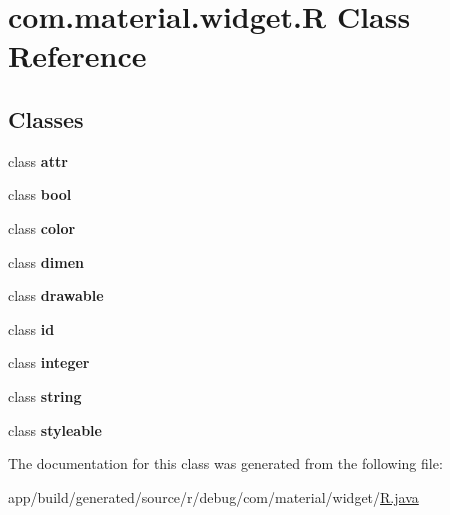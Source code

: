 \hypertarget{classcom_1_1material_1_1widget_1_1_r}{}\section{com.\+material.\+widget.\+R Class Reference}
\label{classcom_1_1material_1_1widget_1_1_r}
\subsection*{Classes}
\begin{DoxyCompactItemize}
\item 
class {\bfseries attr}
\item 
class {\bfseries bool}
\item 
class {\bfseries color}
\item 
class {\bfseries dimen}
\item 
class {\bfseries drawable}
\item 
class {\bfseries id}
\item 
class {\bfseries integer}
\item 
class {\bfseries string}
\item 
class {\bfseries styleable}
\end{DoxyCompactItemize}


The documentation for this class was generated from the following file\+:\begin{DoxyCompactItemize}
\item 
app/build/generated/source/r/debug/com/material/widget/\hyperlink{app_2build_2generated_2source_2r_2debug_2com_2material_2widget_2_r_8java}{R.\+java}\end{DoxyCompactItemize}
